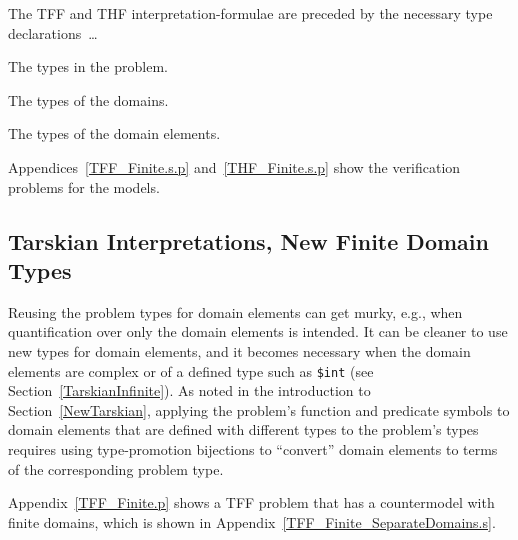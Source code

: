 \documentclass{easychair}
\newenvironment{packed_itemize}{
\vspace*{-0.3em}
\begin{itemize}
\setlength{\partopsep}{0pt}
\setlength{\itemsep}{1pt}
\setlength{\parskip}{0pt}
\setlength{\parsep}{0pt}
}{\end{itemize}}
\begin{document}
The TFF and THF interpretation-formulae are preceded by the necessary type declarations~\ldots
\begin{packed_itemize}
\item The types in the problem.
\item The types of the domains.
\item The types of the domain elements.
\end{packed_itemize}

Appendices~\ref{TFF_Finite.s.p} and~\ref{THF_Finite.s.p} show the verification problems for the 
models.

\subsection{Tarskian Interpretations, New Finite Domain Types}
\label{TarskianNewFiniteTypes}

Reusing the problem types for domain elements can get murky, e.g., when quantification over only 
the domain elements is intended. 
It can be cleaner to use new types for domain elements, and it becomes necessary when the domain 
elements are complex or of a defined type such as {\tt \$int} (see Section~\ref{TarskianInfinite}).
As noted in the introduction to Section~\ref{NewTarskian}, applying the problem's function and 
predicate symbols to domain elements that are defined with different types to the problem's types 
requires using type-promotion bijections to ``convert'' domain elements to terms of the 
corresponding problem type.

Appendix~\ref{TFF_Finite.p} shows a TFF problem that has a countermodel with finite domains,
which is shown in Appendix~\ref{TFF_Finite_SeparateDomains.s}.
\end{document}
